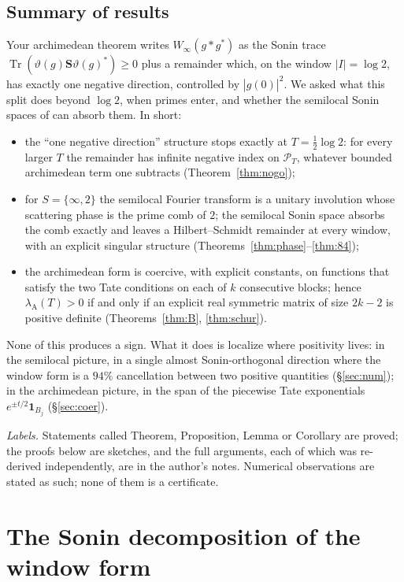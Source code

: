\documentclass[11pt]{amsart}
\theoremstyle{definition}
\theoremstyle{remark}
\newcommand{\Tr}{\operatorname{Tr}}
\newcommand{\PT}{\mathcal P_T}
\newcommand{\lamA}{\lambda_{\mathrm A}}
\begin{document}
\subsection*{Summary of results}
Your archimedean theorem \cite[Thm.~1 and Thm.~6.11]{CC2021} writes $W_\infty(g*g^*)$ as the Sonin trace
$\Tr(\vartheta(g)\mathbf S\vartheta(g)^*)\ge0$ plus a remainder which, on the window $|I|=\log2$, has exactly
one negative direction, controlled by $|\widehat g(0)|^2$. We asked what this split does beyond
$\log2$, when primes enter, and whether the semilocal Sonin spaces of \cite{CCquasi,CCM2023,CCM2024} can
absorb them. In short:
\begin{itemize}
\item[(i)] the ``one negative direction'' structure stops exactly at $T=\frac12\log2$: for every larger $T$ the
remainder has infinite negative index on $\PT$, whatever bounded archimedean term one subtracts
(Theorem~\ref{thm:nogo});
\item[(ii)] for $S=\{\infty,2\}$ the semilocal Fourier transform is a unitary involution whose scattering phase is
the prime comb of $2$; the semilocal Sonin space absorbs the comb exactly and leaves a Hilbert--Schmidt
remainder at every window, with an explicit singular structure (Theorems~\ref{thm:phase}--\ref{thm:84});
\item[(iii)] the archimedean form is coercive, with explicit constants, on functions that satisfy the two Tate
conditions on each of $k$ consecutive blocks; hence $\lamA(T)>0$ if and only if an explicit real symmetric
matrix of size $2k-2$ is positive definite (Theorems~\ref{thm:B}, \ref{thm:schur}).
\end{itemize}
None of this produces a sign. What it does is localize where positivity lives: in the semilocal picture, in a
single almost Sonin-orthogonal direction where the window form is a $94\%$ cancellation between two positive
quantities (\S\ref{sec:num}); in the archimedean picture, in the span of the piecewise Tate exponentials
$e^{\pm t/2}\mathbf 1_{B_j}$ (\S\ref{sec:coer}).

\emph{Labels.} Statements called Theorem, Proposition, Lemma or Corollary are proved; the proofs below are
sketches, and the full arguments, each of which was re-derived independently, are in
the author's notes. Numerical observations are stated as such; none of them is a certificate.

\section{The Sonin decomposition of the window form}\label{sec:sonin}
\end{document}
